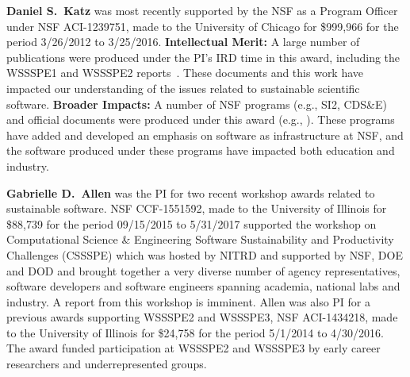 \documentclass[11pt]{article}
\begin{document}
\textbf{Daniel S.~Katz}
was most recently supported by the NSF as a Program Officer under NSF ACI-1239751, made to the University of Chicago for \$999,966 for the period 3/26/2012 to 3/25/2016.  {\bf Intellectual Merit:} A large number of publications were produced under the PI's IRD time in this award, including the WSSSPE1 and WSSSPE2 reports~\cite{WSSSPE1, WSSSPE2}. These documents and this work have impacted our understanding of the issues related to sustainable scientific software.  {\bf Broader Impacts:}
A number of NSF programs (e.g., SI2, CDS\&E) and official documents were produced under this award (e.g., \cite{NSF_software_vision}).  These programs have added and developed an emphasis on software as infrastructure at NSF, and the software produced under these programs have impacted both education and industry.

\textbf{Gabrielle D.~Allen}
was the PI for two recent workshop awards related to sustainable software. NSF CCF-1551592, made to the University of Illinois for \$88,739 for the period 09/15/2015 to 5/31/2017 supported the workshop on Computational Science \& Engineering Software Sustainability and Productivity Challenges (CSSSPE) which was hosted by NITRD and supported by NSF, DOE and DOD and brought together a very diverse number of agency representatives, software developers and software engineers spanning academia, national labs and industry. A report from this workshop is imminent. 
Allen was also PI for a previous awards supporting WSSSPE2 and WSSSPE3, NSF ACI-1434218, made to the University of Illinois for \$24,758 for the period 5/1/2014 to 4/30/2016. The award funded participation at WSSSPE2 and WSSSPE3 by early career researchers and underrepresented groups. 
\end{document}
